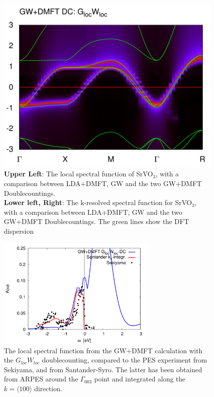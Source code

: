 \documentclass[12pt,a4paper]{scrartcl}
\numberwithin{equation}{section}
\begin{document}
\begin{figure}[h]
\begin{minipage}{0.5\textwidth}
\includegraphics[width=1\textwidth]{figs/results/SrVO3_bands_GWDMFT_glwl.png}  
\end{minipage}

\caption{
\textbf{Upper Left}: The local spectral function of SrVO$_3$, with a comparison
between LDA+DMFT, GW and the two GW+DMFT Doublecountings.\\
\textbf{Lower left, Right}:
The k-resolved spectral function for SrVO$_3$, with a comparison
between LDA+DMFT, GW and the two GW+DMFT Doublecountings.
The green lines show the DFT dispersion}
\label{fig:results_BS_svo}
\end{figure}



\begin{figure}[H]
\begin{center}
\includegraphics[width=0.7\textwidth]{figs/results/SrVO_spec_ARPES.pdf} 
\end{center}
\caption{
The local spectral function from the GW+DMFT calculation with the 
$G_{loc}W_{loc}$ doublecounting, compared to the PES experiment from Sekiyama,
and from Santander-Syro. The latter has been obtained from ARPES around the 
$\Gamma_{003}$ point and integrated along the $k=\langle 100 \rangle$ direction.}
\label{fig:results_arpes_svo}
\end{figure}
\end{document}
